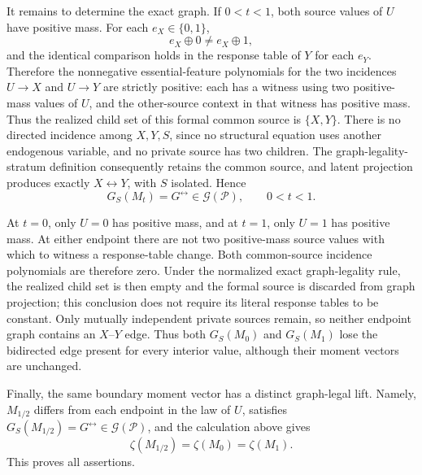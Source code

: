 It remains to determine the exact graph.  If \(0<t<1\), both source values of \(U\) have positive mass.  For each \(e_X\in\{0,1\}\),
\[
 e_X\oplus0\ne e_X\oplus1,
\]
and the identical comparison holds in the response table of \(Y\) for each \(e_Y\).  Therefore the nonnegative essential-feature polynomials for the two incidences \(U\to X\) and \(U\to Y\) are strictly positive: each has a witness using two positive-mass values of \(U\), and the other-source context in that witness has positive mass.  Thus the realized child set of this formal common source is \(\{X,Y\}\).  There is no directed incidence among \(X,Y,S\), since no structural equation uses another endogenous variable, and no private source has two children.  The graph-legality-stratum definition consequently retains the common source, and latent projection produces exactly \(X\leftrightarrow Y\), with \(S\) isolated.  Hence
\[
 G_S(M_t)=G^{\leftrightarrow}\in\mathcal G(\mathcal P),
 \qquad 0<t<1.
\]

At \(t=0\), only \(U=0\) has positive mass, and at \(t=1\), only \(U=1\) has positive mass.  At either endpoint there are not two positive-mass source values with which to witness a response-table change.  Both common-source incidence polynomials are therefore zero.  Under the normalized exact graph-legality rule, the realized child set is then empty and the formal source is discarded from graph projection; this conclusion does not require its literal response tables to be constant.  Only mutually independent private sources remain, so neither endpoint graph contains an \(X\)--\(Y\) edge.  Thus both \(G_S(M_0)\) and \(G_S(M_1)\) lose the bidirected edge present for every interior value, although their moment vectors are unchanged.

Finally, the same boundary moment vector has a distinct graph-legal lift.  Namely, \(M_{1/2}\) differs from each endpoint in the law of \(U\), satisfies \(G_S(M_{1/2})=G^{\leftrightarrow}\in\mathcal G(\mathcal P)\), and the calculation above gives
\[
 \zeta(M_{1/2})=\zeta(M_0)=\zeta(M_1).
\]
This proves all assertions.
